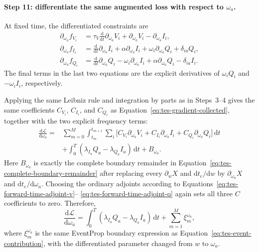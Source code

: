 \paragraph{Step 11: differentiate the same augmented loss with respect to
$\omega_a$.}
At fixed time, the differentiated constraints are
\begin{align}
    \partial_{\omega_a}f_{V_i}
      &=\tau_V\frac{\mathrm d}{\mathrm dt}
          \partial_{\omega_a}V_i
        +\partial_{\omega_a}V_i
        -\partial_{\omega_a}I_i,
        \label{eq:tes-omega-differentiate-fv}\\
    \partial_{\omega_a}f_{I_i}
      &=\frac{\mathrm d}{\mathrm dt}\partial_{\omega_a}I_i
        +\alpha\partial_{\omega_a}I_i
        +\omega_i\partial_{\omega_a}Q_i
        +\delta_{ia}Q_i,
        \label{eq:tes-omega-differentiate-fi}\\
    \partial_{\omega_a}f_{Q_i}
      &=\frac{\mathrm d}{\mathrm dt}\partial_{\omega_a}Q_i
        -\omega_i\partial_{\omega_a}I_i
        +\alpha\partial_{\omega_a}Q_i
        -\delta_{ia}I_i.
        \label{eq:tes-omega-differentiate-fq}
\end{align}
The final terms in the last two equations are the explicit derivatives of
$\omega_iQ_i$ and $-\omega_iI_i$, respectively.

Applying the same Leibniz rule and integration by parts as in
Steps~3--4 gives the same coefficients $C_{V_i}$, $C_{I_i}$, and $C_{Q_i}$
as Equation~\eqref{eq:tes-gradient-collected}, together with the two explicit
frequency terms:
\begin{align}
    \frac{\mathrm d\mathcal L}{\mathrm d\omega_a}
    ={}&\sum_{m=0}^{M}\int_{t_m}^{t_{m+1}}\sum_i
      \Big[
        C_{V_i}\partial_{\omega_a}V_i
       +C_{I_i}\partial_{\omega_a}I_i
       +C_{Q_i}\partial_{\omega_a}Q_i
      \Big]\,\mathrm dt
      \nonumber\\
    &+\int_0^T
      \left(\lambda_{I_a}Q_a-\lambda_{Q_a}I_a\right)\,\mathrm dt
      +B_{\omega_a}.
    \label{eq:tes-omega-gradient-before-cancellation}
\end{align}
Here $B_{\omega_a}$ is exactly the complete boundary remainder in
Equation~\eqref{eq:tes-complete-boundary-remainder} after replacing every
$\partial_wX$ and $\mathrm dt_e/\mathrm dw$ by
$\partial_{\omega_a}X$ and $\mathrm dt_e/\mathrm d\omega_a$.
Choosing the ordinary adjoints according to
Equations~\eqref{eq:tes-forward-time-adjoint-v}--
\eqref{eq:tes-forward-time-adjoint-q} again sets all three $C$ coefficients
to zero. Therefore,
\begin{equation}
    \frac{\mathrm d\mathcal L}{\mathrm d\omega_a}
      =\int_0^T
        \left(\lambda_{I_a}Q_a-\lambda_{Q_a}I_a\right)\,\mathrm dt
       +\sum_{m=1}^{M}\xi_m^{\omega_a},
    \label{eq:tes-omega-gradient-event-remainder}
\end{equation}
where $\xi_m^{\omega_a}$ is the same EventProp boundary expression as
Equation~\eqref{eq:tes-event-contribution}, with the differentiated parameter
changed from $w$ to $\omega_a$.

